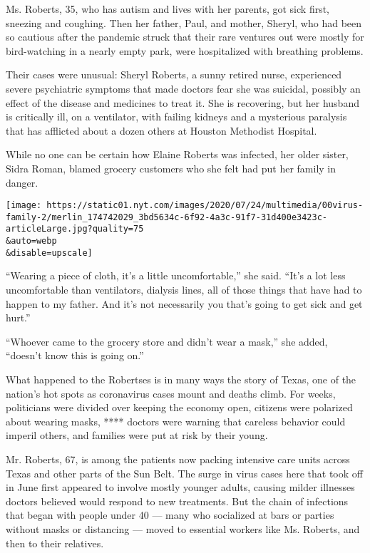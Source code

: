 Ms. Roberts, 35, who has autism and lives with her parents, got sick
first, sneezing and coughing. Then her father, Paul, and mother, Sheryl,
who had been so cautious after the pandemic struck that their rare
ventures out were mostly for bird-watching in a nearly empty park, were
hospitalized with breathing problems.

Their cases were unusual: Sheryl Roberts, a sunny retired nurse,
experienced severe psychiatric symptoms that made doctors fear she was
suicidal, possibly an effect of the disease and medicines to treat it.
She is recovering, but her husband is critically ill, on a ventilator,
with failing kidneys and a mysterious paralysis that has afflicted about
a dozen others at Houston Methodist Hospital.

While no one can be certain how Elaine Roberts was infected, her older
sister, Sidra Roman, blamed grocery customers who she felt had put her
family in danger.

\texttt{[image: https://static01.nyt.com/images/2020/07/24/multimedia/00virus-family-2/merlin\_174742029\_3bd5634c-6f92-4a3c-91f7-31d400e3423c-articleLarge.jpg?quality=75\\\&auto=webp\\\&disable=upscale]}

``Wearing a piece of cloth, it's a little uncomfortable,'' she said.
``It's a lot less uncomfortable than ventilators, dialysis lines, all of
those things that have had to happen to my father. And it's not
necessarily you that's going to get sick and get hurt.''

``Whoever came to the grocery store and didn't wear a mask,'' she added,
``doesn't know this is going on.''

What happened to the Robertses is in many ways the story of Texas, one
of the nation's hot spots as coronavirus cases mount and deaths climb.
For weeks, politicians were divided over keeping the economy open,
citizens were polarized about wearing masks, **** doctors were warning
that careless behavior could imperil others, and families were put at
risk by their young.

Mr. Roberts, 67, is among the patients now packing intensive care units
across Texas and other parts of the Sun Belt. The surge in virus cases
here that took off in June first appeared to involve mostly younger
adults, causing milder illnesses doctors believed would respond to new
treatments. But the chain of infections that began with people under 40
--- many who socialized at bars or parties without masks or distancing
--- moved to essential workers like Ms. Roberts, and then to their
relatives.

